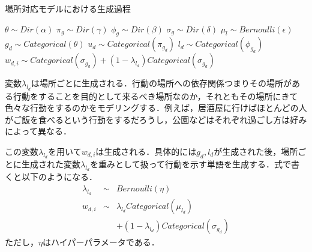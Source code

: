 \documentclass[a4j,10pt, twocolumn]{jarticle}
\begin{document}
\begin{algorithm}[tb]
  \caption{場所対応モデルにおける生成過程}\label{location-aware-generative-part}
  \begin{algorithmic}[1]
    \State $\theta \sim Dir(\alpha)$ 
    \State $\pi_g \sim Dir(\gamma)$ 
    \State $\phi_g \sim Dir(\beta)$ 
    \State $\sigma_g \sim Dir(\delta)$ 
    \EndFor
     
    \State $\mu_l \sim Bernoulli(\epsilon)$
    \EndFor
     
    \State $g_d \sim Categorical(\theta)$ 
    \State $u_d \sim Categorical(\pi_{g_d})$ 
    \State $l_d \sim Categorical(\phi_{g_d})$ 
    \State $w_{d, i} \sim Categorical(\sigma_{g_d}) + (1-\lambda_{l_d}) Categorical(\sigma_{g_d})$ 
    \EndFor
    \EndFor
  \end{algorithmic}
\end{algorithm}
%
変数$\lambda_{l_d}$は場所ごとに生成される．行動の場所への依存関係つまりその場所がある行動をすることを目的として来るべき場所なのか，それともその場所にきて色々な行動をするのかをモデリングする．例えば，居酒屋に行けばほとんどの人がご飯を食べるという行動をするだろうし，公園などはそれぞれ過ごし方は好みによって異なる．

この変数$\lambda_{l_d}$を用いて$w_{d, i}$は生成される．具体的には$g_d, l_d$が生成された後，場所ごとに生成された変数$\lambda_{l_d}$を重みとして扱って行動を示す単語を生成する．式で書くと以下のようになる．
\begin{eqnarray}
  \lambda_{l_d} &\sim& Bernoulli(\eta) \\
  w_{d,i} &\sim& \lambda_{l_d} Categorical(\mu_{l_d})  \nonumber \\
  &&+ (1-\lambda_{l_d}) Categorical(\sigma_{g_d})
\end{eqnarray}
ただし，$\eta$はハイパーパラメータである．
\end{document}
